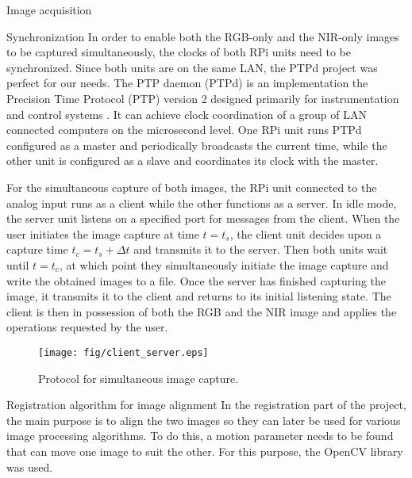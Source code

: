 \documentclass[11pt]{article}
\begin{document}
\begin{section}{Image acquisition}
    \begin{subsection}{Synchronization}
        \label{sec:synchronization}
        In order to enable both the RGB-only and the NIR-only images to be captured simultaneously, the clocks of both RPi units need to be synchronized. Since both units are on the same LAN, the PTPd project was perfect for our needs. The PTP daemon (PTPd) is an implementation the Precision Time Protocol (PTP) version 2 designed primarily for instrumentation and control systems \cite{ptp}. It can achieve clock coordination of a group of LAN connected computers on the microsecond level. One RPi unit runs PTPd configured as a master and periodically broadcasts the current time, while the other unit is configured as a slave and coordinates its clock with the master.

        \medskip

        For the simultaneous capture of both images, the RPi unit connected to the analog input runs as a client while the other functions as a server. In idle mode, the server unit listens on a specified port for messages from the client. When the user initiates the image capture at time $t=t_s$, the client unit decides upon a capture time $t_c=t_s+\Delta t$ and transmits it to the server. Then both units wait until $t=t_c$, at which point they simultaneously initiate the image capture and write the obtained images to a file. Once the server has finished capturing the image, it transmits it to the client and returns to its initial listening state. The client is then in possession of both the RGB and the NIR image and applies the operations requested by the  user.

        \begin{figure}[!h]
            \begin{center}
                \texttt{[image: fig/client\_server.eps]}
                \caption{Protocol for simultaneous image capture.}
                \label{fig:client_server}
            \end{center}
        \end{figure}

    \end{subsection} %

    \begin{subsection}{Registration algorithm for image alignment}
        \label{sec:image_registration}
        In the registration part of the project, the main purpose is to align the two images so they can later be used for various image processing algorithms. To do this, a motion parameter needs to be found that can move one image to suit the other. For this purpose, the OpenCV library was used.


\end{subsection}
\end{section}
\end{document}
